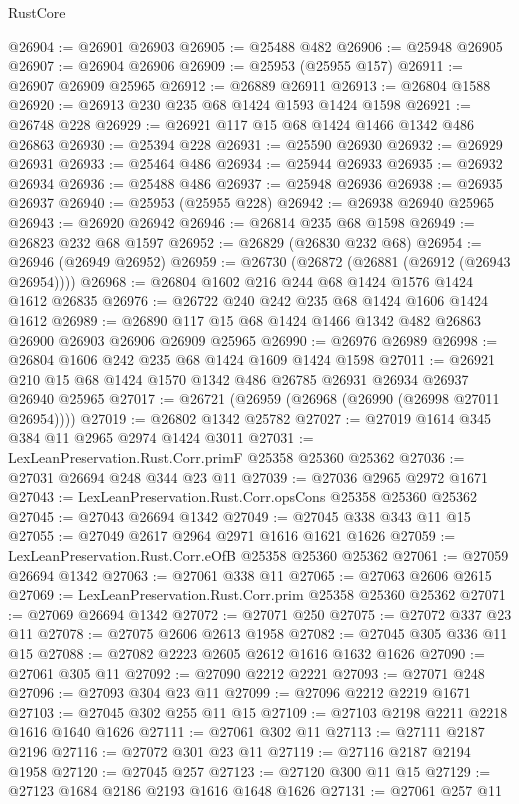 \begin{lexlean}{RustCore}
\begin{coremodule}
@26904 := @26901 @26903
@26905 := @25488 @482
@26906 := @25948 @26905
@26907 := @26904 @26906
@26909 := @25953 (@25955 @157)
@26911 := @26907 @26909 @25965
@26912 := @26889 @26911
@26913 := @26804 @1588
@26920 := @26913 @230 @235 @68 @1424 @1593 @1424 @1598
@26921 := @26748 @228
@26929 := @26921 @117 @15 @68 @1424 @1466 @1342 @486 @26863
@26930 := @25394 @228
@26931 := @25590 @26930
@26932 := @26929 @26931
@26933 := @25464 @486
@26934 := @25944 @26933
@26935 := @26932 @26934
@26936 := @25488 @486
@26937 := @25948 @26936
@26938 := @26935 @26937
@26940 := @25953 (@25955 @228)
@26942 := @26938 @26940 @25965
@26943 := @26920 @26942
@26946 := @26814 @235 @68 @1598
@26949 := @26823 @232 @68 @1597
@26952 := @26829 (@26830 @232 @68)
@26954 := @26946 (@26949 @26952)
@26959 := @26730 (@26872 (@26881 (@26912 (@26943 @26954))))
@26968 := @26804 @1602 @216 @244 @68 @1424 @1576 @1424 @1612 @26835
@26976 := @26722 @240 @242 @235 @68 @1424 @1606 @1424 @1612
@26989 := @26890 @117 @15 @68 @1424 @1466 @1342 @482 @26863 @26900 @26903 @26906 @26909 @25965
@26990 := @26976 @26989
@26998 := @26804 @1606 @242 @235 @68 @1424 @1609 @1424 @1598
@27011 := @26921 @210 @15 @68 @1424 @1570 @1342 @486 @26785 @26931 @26934 @26937 @26940 @25965
@27017 := @26721 (@26959 (@26968 (@26990 (@26998 @27011 @26954))))
@27019 := @26802 @1342 @25782
@27027 := @27019 @1614 @345 @384 @11 @2965 @2974 @1424 @3011
@27031 := LexLeanPreservation.Rust.Corr.primF @25358 @25360 @25362
@27036 := @27031 @26694 @248 @344 @23 @11
@27039 := @27036 @2965 @2972 @1671
@27043 := LexLeanPreservation.Rust.Corr.opsCons @25358 @25360 @25362
@27045 := @27043 @26694 @1342
@27049 := @27045 @338 @343 @11 @15
@27055 := @27049 @2617 @2964 @2971 @1616 @1621 @1626
@27059 := LexLeanPreservation.Rust.Corr.eOfB @25358 @25360 @25362
@27061 := @27059 @26694 @1342
@27063 := @27061 @338 @11
@27065 := @27063 @2606 @2615
@27069 := LexLeanPreservation.Rust.Corr.prim @25358 @25360 @25362
@27071 := @27069 @26694 @1342
@27072 := @27071 @250
@27075 := @27072 @337 @23 @11
@27078 := @27075 @2606 @2613 @1958
@27082 := @27045 @305 @336 @11 @15
@27088 := @27082 @2223 @2605 @2612 @1616 @1632 @1626
@27090 := @27061 @305 @11
@27092 := @27090 @2212 @2221
@27093 := @27071 @248
@27096 := @27093 @304 @23 @11
@27099 := @27096 @2212 @2219 @1671
@27103 := @27045 @302 @255 @11 @15
@27109 := @27103 @2198 @2211 @2218 @1616 @1640 @1626
@27111 := @27061 @302 @11
@27113 := @27111 @2187 @2196
@27116 := @27072 @301 @23 @11
@27119 := @27116 @2187 @2194 @1958
@27120 := @27045 @257
@27123 := @27120 @300 @11 @15
@27129 := @27123 @1684 @2186 @2193 @1616 @1648 @1626
@27131 := @27061 @257 @11

\end{coremodule}
\end{lexlean}
